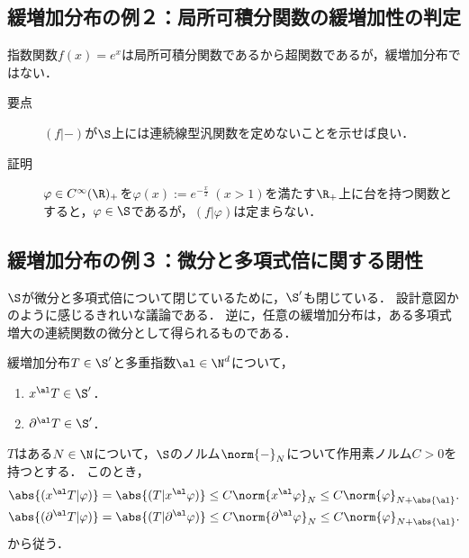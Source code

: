\documentclass[uplatex,dvipdfmx]{jsreport}
\begin{document}
\subsection{緩増加分布の例２：局所可積分関数の緩増加性の判定}

\begin{example}[緩増加でない例]
    指数関数$f(x)=e^x$は局所可積分関数であるから超関数であるが，緩増加分布ではない．
\end{example}
\begin{Proof}\mbox{}
    \begin{description}
        \item[要点] $(f|-)$が$\S$上には連続線型汎関数を定めないことを示せば良い．
        \item[証明] $\varphi\in C^\infty(\R)_+$を$\varphi(x):=e^{-\frac{x}{2}}\;(x>1)$を満たす$\R_+$上に台を持つ関数とすると，$\varphi\in\S$であるが，$(f|\varphi)$は定まらない．
    \end{description}
\end{Proof}

\subsection{緩増加分布の例３：微分と多項式倍に関する閉性}

\begin{tcolorbox}[colframe=ForestGreen, colback=ForestGreen!10!white,breakable,colbacktitle=ForestGreen!40!white,coltitle=black,fonttitle=\bfseries\sffamily,
title=]
    $\S$が微分と多項式倍について閉じているために，$\S'$も閉じている．
    設計意図かのように感じるきれいな議論である．
    逆に，任意の緩増加分布は，ある多項式増大の連続関数の微分として得られるものである．
\end{tcolorbox}

\begin{proposition}
    緩増加分布$T\in\S'$と多重指数$\al\in\N^d$について，
    \begin{enumerate}
        \item $x^\al T\in\S'$．
        \item $\partial^\al T\in\S'$．
    \end{enumerate}
\end{proposition}
\begin{Proof}
    $T$はある$N\in\N$について，$\S$のノルム$\norm{-}_N$について作用素ノルム$C>0$を持つとする．
    このとき，
    \begin{align*}
        \abs{(x^\al T|\varphi)}&=\abs{(T|x^\al\varphi)}\le C\norm{x^\al\varphi}_N\le C\norm{\varphi}_{N+\abs{\al}}.\\
        \abs{(\partial^\al T|\varphi)}&=\abs{(T|\partial^\al\varphi)}\le C\norm{\partial^\al\varphi}_N\le C\norm{\varphi}_{N+\abs{\al}}.
    \end{align*}
    から従う．
\end{Proof}
\end{document}

